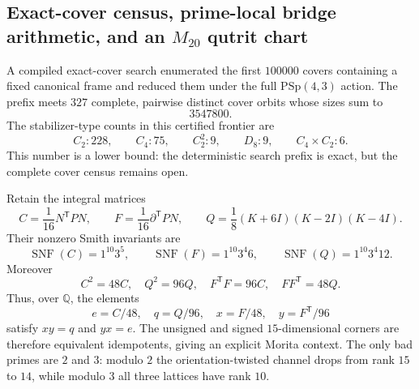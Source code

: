 \makeatletter
{}
\makeatother
\providecommand{\PSp}{\mathrm{PSp}}
\providecommand{\Aut}{\mathrm{Aut}}
\providecommand{\spec}{\operatorname{spec}}


\subsection*{Exact-cover census, prime-local bridge arithmetic, and an $M_{20}$ qutrit chart}

A compiled exact-cover search enumerated the first $100000$ covers containing a
fixed canonical frame and reduced them under the full $\PSp(4,3)$ action.  The
prefix meets $327$ complete, pairwise distinct cover orbits whose sizes sum to
\[
  3547800.
\]
The stabilizer-type counts in this certified frontier are
\[
 C_2:228,\qquad C_4:75,\qquad C_2^2:9,
 \qquad D_8:9,\qquad C_4\times C_2:6.
\]
This number is a lower bound: the deterministic search prefix is exact, but the
complete cover census remains open.

Retain the integral matrices
\[
 C=\frac1{16}N^{\mathsf T}PN,
 \qquad
 F=\frac1{16}\partial^{\mathsf T}PN,
 \qquad
 Q=\frac1{8}(K+6I)(K-2I)(K-4I).
\]
Their nonzero Smith invariants are
\[
 \operatorname{SNF}(C)=1^{10}3^5,
 \qquad
 \operatorname{SNF}(F)=1^{10}3^4 6,
 \qquad
 \operatorname{SNF}(Q)=1^{10}3^4 12.
\]
Moreover
\[
 C^2=48C,
 \quad Q^2=96Q,
 \quad F^{\mathsf T}F=96C,
 \quad FF^{\mathsf T}=48Q.
\]
Thus, over $\mathbb Q$, the elements
\[
 e=C/48,
 \quad q=Q/96,
 \quad x=F/48,
 \quad y=F^{\mathsf T}/96
\]
satisfy $xy=q$ and $yx=e$.  The unsigned and signed $15$-dimensional corners
are therefore equivalent idempotents, giving an explicit Morita context.  The
only bad primes are $2$ and $3$: modulo $2$ the orientation-twisted channel
drops from rank $15$ to $14$, while modulo $3$ all three lattices have rank
$10$.

